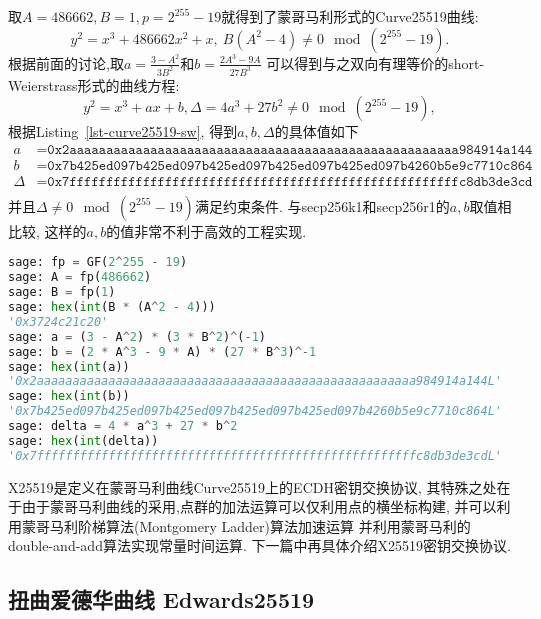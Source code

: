 \documentclass{article}
\begin{document}
取$A = 486662, B = 1, p = 2^{255}-19$就得到了蒙哥马利形式的Curve25519曲线:
$$
y^2 = x^3 + 486662x^2 + x,\  B(A^2-4)\neq 0 \mod (2^{255}-19).
$$
根据前面的讨论,取$a = \frac{3-A^2}{3B^2}$和$b = \frac{2A^3 - 9A}{27B^3}$
可以得到与之双向有理等价的short-Weierstrass形式的曲线方程:
$$
y^2 = x^3 + ax + b, \Delta = 4a^3 + 27b^2 \neq 0\mod (2^{255}-19),
$$
根据Listing~\ref{lst-curve25519-sw}, 得到$a,b,\Delta$的具体值如下
\begin{equation*}
\begin{array}{rl}
a & = \texttt{0x2aaaaaaaaaaaaaaaaaaaaaaaaaaaaaaaaaaaaaaaaaaaaaaaaaaaaa984914a144} \\
b & = \texttt{0x7b425ed097b425ed097b425ed097b425ed097b425ed097b4260b5e9c7710c864} \\
\Delta &= \texttt{0x7fffffffffffffffffffffffffffffffffffffffffffffffffffffc8db3de3cd}\\
\end{array}
\end{equation*}
并且$\Delta\neq 0\mod (2^{255}-19)$满足约束条件.
与secp256k1和secp256r1的$a,b$取值相比较, 这样的$a,b$的值非常不利于高效的工程实现.

\begin{lstlisting}[language = python, caption = Curve25519曲线的short-Weierstrass形式的曲线参数,label=lst-curve25519-sw]
sage: fp = GF(2^255 - 19)
sage: A = fp(486662)
sage: B = fp(1)
sage: hex(int(B * (A^2 - 4)))
'0x3724c21c20'
sage: a = (3 - A^2) * (3 * B^2)^(-1)
sage: b = (2 * A^3 - 9 * A) * (27 * B^3)^-1
sage: hex(int(a))
'0x2aaaaaaaaaaaaaaaaaaaaaaaaaaaaaaaaaaaaaaaaaaaaaaaaaaaaa984914a144L'
sage: hex(int(b))
'0x7b425ed097b425ed097b425ed097b425ed097b425ed097b4260b5e9c7710c864L'
sage: delta = 4 * a^3 + 27 * b^2
sage: hex(int(delta))
'0x7fffffffffffffffffffffffffffffffffffffffffffffffffffffc8db3de3cdL'
\end{lstlisting}

X25519是定义在蒙哥马利曲线Curve25519上的ECDH密钥交换协议,
其特殊之处在于由于蒙哥马利曲线的采用,点群的加法运算可以仅利用点的横坐标构建,
并可以利用蒙哥马利阶梯算法(Montgomery Ladder)算法加速运算
并利用蒙哥马利的double-and-add算法实现常量时间运算.
下一篇中再具体介绍X25519密钥交换协议.

\subsection{扭曲爱德华曲线 Edwards25519}
\end{document}

